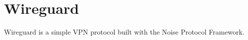 \hypertarget{wireguard}{%
\chapter{Wireguard}\label{wireguard}}

Wireguard is a simple VPN protocol built with the Noise Protocol
Framework.
